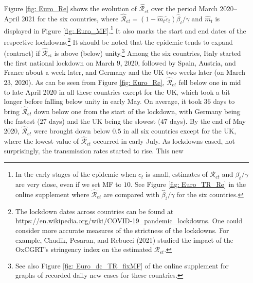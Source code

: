 \documentclass[12pt]{article}
\begin{document}
\begin{figure}[htp]
\begin{footnotesize}
\end{footnotesize}%
%

\end{figure}%


Figure \ref{fig: Euro_Re} shows the evolution of $\mathcal{\hat{R}}_{et}$ over
the period March 2020--April 2021 for the six countries, where $\mathcal{\hat
{R}}_{et}=\left(  1-\hat{m}_{t}\tilde{c}_{t}\right)  \hat{\beta}_{t}/\gamma$
and $\hat{m}_{t}$ is displayed in Figure \ref{fig: Euro_MF}.\footnote{In the
early stages of the epidemic when $c_{t}$ is small, estimates of
$\mathcal{R}_{et}$ and $\beta_{t}/\gamma$ are very close, even if we set MF to
$10$. See Figure \ref{fig: Euro_TR_Re} in the online supplement where
$\mathcal{\hat{R}}_{et}$ are compared with $\hat{\beta}_{t}/\gamma$ for the
six countries.} It also marks the start and end dates of the respective
lockdowns.\footnote{The lockdown dates across countries can be found at
\url{https://en.wikipedia.org/wiki/COVID-19_pandemic_lockdowns}. One could
consider more accurate measures of the strictness of the lockdowns. For
example, Chudik, Pesaran, and Rebucci (2021) studied the impact of the
OxCGRT's stringency index on the estimated $\mathcal{R}_{et}$.} It should be
noted that the epidemic tends to expand (contract) if $\mathcal{\hat{R}}_{et}$
is above (below) unity.\footnote{See also Figure \ref{fig: Euro_dc_TR_fixMF}
of the online supplement for graphs of recorded daily new cases for these
countries.} Among the six countries, Italy started the first national lockdown
on March 9, 2020, followed by Spain, Austria, and France about a week later,
and Germany and the UK two weeks later (on March 23, 2020). As can be seen
from Figure \ref{fig: Euro_Re}, $\mathcal{\hat{R}}_{et}$ fell below one in mid
to late April 2020 in all these countries except for the UK, which took a bit
longer before falling below unity in early May. On average, it took $36$ days
to bring $\mathcal{\hat{R}}_{et}$ down below one from the start of the
lockdown, with Germany being the fastest ($27$ days) and the UK being the
slowest ($47$ days). By the end of May 2020, $\mathcal{\hat{R}}_{et}$ were
brought down below $0.5$ in all six countries except for the UK, where the
lowest value of $\mathcal{\hat{R}}_{et}$ occurred in early July. As lockdowns
eased, not surprisingly, the transmission rates started to rise. This new
\end{document}
